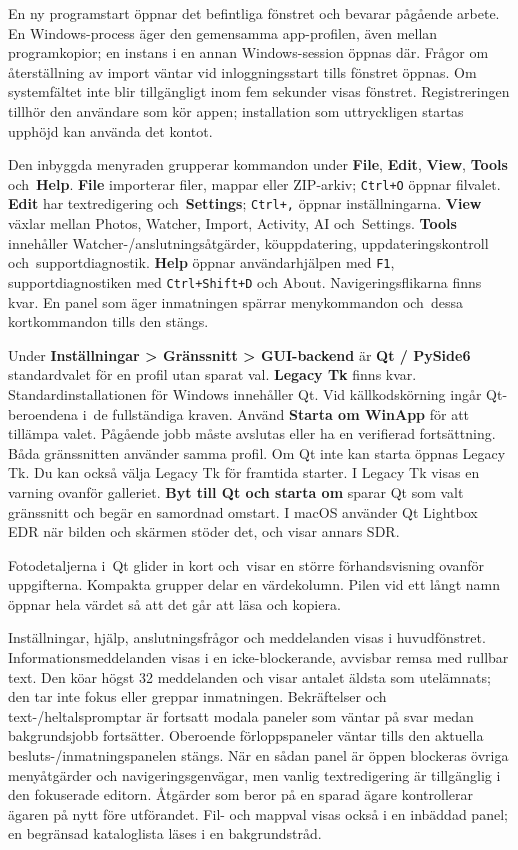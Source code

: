 \documentclass[11pt,a4paper]{article}
\newcommand{\ui}[1]{\textbf{#1}}
\begin{document}
En ny programstart öppnar det befintliga fönstret och bevarar pågående arbete.
En Windows-process äger den gemensamma app-profilen, även mellan programkopior;
en instans i en annan Windows-session öppnas där. Frågor om återställning av
import väntar vid inloggningsstart tills fönstret öppnas. Om systemfältet inte
blir tillgängligt inom fem sekunder visas fönstret. Registreringen tillhör den
användare som kör appen; installation som uttryckligen startas upphöjd kan
använda
det kontot.

Den inbyggda menyraden grupperar kommandon under \ui{File}, \ui{Edit},
\ui{View}, \ui{Tools} och~\ui{Help}. \ui{File} importerar filer, mappar
eller ZIP-arkiv; \texttt{Ctrl+O} öppnar filvalet. \ui{Edit} har
textredigering och~\ui{Settings}; \texttt{Ctrl+,} öppnar inställningarna.
\ui{View} växlar mellan Photos, Watcher, Import, Activity, AI och~Settings.
\ui{Tools} innehåller Watcher-/anslutningsåtgärder, köuppdatering,
uppdateringskontroll och~supportdiagnostik. \ui{Help} öppnar användarhjälpen
med \texttt{F1}, supportdiagnostiken med \texttt{Ctrl+Shift+D} och About.
Navigeringsflikarna finns kvar. En panel som äger inmatningen spärrar
menykommandon och~dessa kortkommandon tills den stängs.

Under \ui{Inställningar > Gränssnitt > GUI-backend} är \ui{Qt / PySide6}
standardvalet för en profil utan sparat val. \ui{Legacy Tk} finns kvar.
Standardinstallationen för Windows innehåller Qt. Vid källkodskörning ingår
Qt-beroendena i~de fullständiga kraven.
Använd \ui{Starta om WinApp} för att tillämpa valet. Pågående jobb måste
avslutas eller ha en verifierad fortsättning. Båda gränssnitten använder samma
profil. Om Qt inte kan starta öppnas Legacy Tk. Du kan också välja Legacy Tk
för framtida starter. I Legacy Tk visas en varning ovanför galleriet.
\ui{Byt till Qt och starta om} sparar Qt som valt gränssnitt och begär en
samordnad omstart. I macOS använder Qt Lightbox EDR när bilden och skärmen
stöder det, och visar annars SDR.

Fotodetaljerna i~Qt glider in kort och~visar en större förhandsvisning ovanför
uppgifterna. Kompakta grupper delar en värdekolumn. Pilen vid ett långt namn
öppnar hela värdet så att det går att läsa och kopiera.

Inställningar, hjälp, anslutningsfrågor och meddelanden visas i huvudfönstret.
Informationsmeddelanden visas i en icke-blockerande, avvisbar remsa med
rullbar text. Den köar högst 32 meddelanden och visar antalet äldsta som
utelämnats; den tar inte fokus eller greppar inmatningen. Bekräftelser och
text-/heltalspromptar är fortsatt modala paneler som väntar på svar medan
bakgrundsjobb fortsätter. Oberoende förloppspaneler väntar tills den aktuella
besluts-/inmatningspanelen stängs. När en sådan panel är öppen blockeras
övriga menyåtgärder och navigeringsgenvägar, men vanlig textredigering är tillgänglig
i den fokuserade editorn. Åtgärder som beror på en sparad ägare kontrollerar
ägaren på nytt före utförandet. Fil- och mappval visas också i en inbäddad
panel; en begränsad kataloglista läses i en bakgrundstråd.
\end{document}
